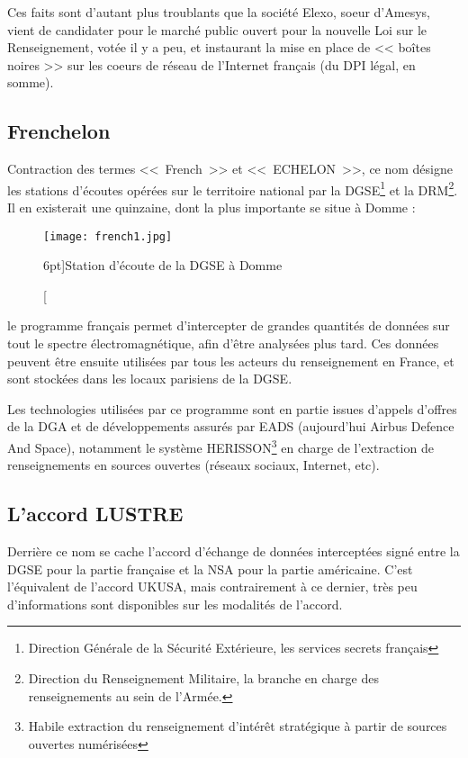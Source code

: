 Ces faits sont d'autant plus troublants que la société Elexo, soeur
d'Amesys, vient de candidater\citep{elexo} pour le marché public ouvert pour la
nouvelle Loi sur le Renseignement, votée il y a peu, et instaurant la mise en place de <<
boîtes noires >> sur les coeurs de réseau de l'Internet français\citep{LR} (du
DPI légal, en somme).

\newpage
\subsection{Frenchelon}

Contraction des termes <<~French~>> et <<~ECHELON~>>, ce nom
désigne les stations d'écoutes opérées sur le territoire national par la
DGSE\footnote{Direction Générale de la Sécurité Extérieure, les services secrets
français} et la DRM\footnote{Direction du Renseignement Militaire, la branche
en charge des renseignements au sein de l'Armée.}. Il en existerait une
quinzaine, dont la plus importante se situe à Domme :

\vspace{0.7cm}
\begin{figure}
\texttt{[image: french1.jpg]}
\caption[Station d'écoute de Domme][6pt]{Station d'écoute de la DGSE
à Domme}
\label{fig:french1}
\end{figure}


 le programme français permet d'intercepter de
grandes quantités de données sur tout le spectre électromagnétique, afin d'être
analysées plus tard. Ces données peuvent être ensuite utilisées par tous les
acteurs du renseignement en France, et sont stockées dans les locaux parisiens
de la DGSE.\citep{bbf}

Les technologies utilisées par ce programme sont en partie issues
d'appels d'offres de la DGA et de développements assurés par EADS (aujourd'hui
Airbus Defence And Space), notamment le système HERISSON\footnote{Habile
extraction du renseignement d'intérêt stratégique à partir de sources ouvertes
numérisées}\citep{herisson} en charge de l'extraction de renseignements en
sources ouvertes (réseaux sociaux, Internet, etc).

\newpage
\subsection{L'accord LUSTRE}

Derrière ce nom se cache l'accord d'échange de données
interceptées signé entre la DGSE pour la partie française et la NSA pour la
partie américaine. C'est l'équivalent de l'accord UKUSA, mais contrairement à ce
dernier, très peu d'informations sont disponibles sur les modalités de l'accord.

